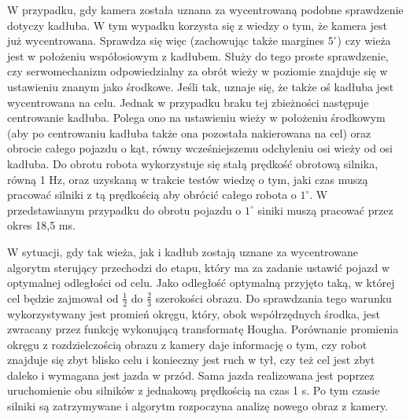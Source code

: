 W przypadku, gdy kamera została uznana za wycentrowaną podobne sprawdzenie dotyczy kadłuba. W tym wypadku korzysta się z wiedzy o tym, że kamera jest już wycentrowana. Sprawdza się więc (zachowując także margines $5^\circ$) czy wieża jest w położeniu współosiowym z kadłubem. Służy do tego proste sprawdzenie, czy serwomechanizm odpowiedzialny za obrót wieży w poziomie znajduje się w ustawieniu znanym jako środkowe. Jeśli tak, uznaje się, że także oś kadłuba jest wycentrowana na celu. Jednak w przypadku braku tej zbieżności następuje centrowanie kadłuba. Polega ono na ustawieniu wieży w położeniu środkowym (aby po centrowaniu kadłuba także ona pozostała nakierowana na cel) oraz obrocie całego pojazdu o kąt, równy wcześniejszemu odchyleniu osi wieży od osi kadłuba. Do obrotu robota wykorzystuje się stałą prędkość obrotową silnika, równą 1 Hz, oraz uzyskaną w trakcie testów wiedzę o tym, jaki czas muszą pracować silniki z tą prędkością aby obrócić całego robota o $1^\circ$. W przedstawianym przypadku do obrotu pojazdu o $1^\circ$ siniki muszą pracować przez okres 18,5 ms.

W sytuacji, gdy tak wieża, jak i kadłub zostają uznane za wycentrowane algorytm sterujący przechodzi do etapu, który ma za zadanie ustawić pojazd w optymalnej odległości od celu. Jako odległość optymalną przyjęto taką, w której cel będzie zajmował od $\frac{1}{2}$ do $\frac{2}{3}$ szerokości obrazu. Do sprawdzania tego warunku wykorzystywany jest promień okręgu, który, obok współrzędnych środka, jest zwracany przez funkcję wykonującą transformatę Hougha. Porównanie promienia okręgu z rozdzielczością obrazu z kamery daje informację o tym, czy robot znajduje się zbyt blisko celu i konieczny jest ruch w tył, czy też cel jest zbyt daleko i wymagana jest jazda w przód. Sama jazda realizowana jest poprzez uruchomienie obu silników z jednakową prędkością na czas 1 s. Po tym czasie silniki są zatrzymywane i algorytm rozpoczyna analizę nowego obraz z kamery.

















    
